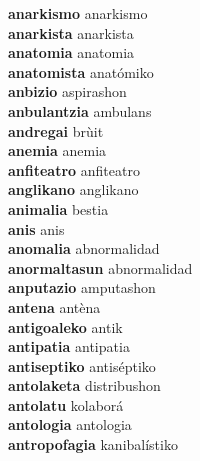 \textbf{anarkismo } anarkismo \\
\textbf{anarkista } anarkista \\
\textbf{anatomia } anatomia \\
\textbf{anatomista } anatómiko \\
\textbf{anbizio } aspirashon \\
\textbf{anbulantzia } ambulans \\
\textbf{andregai } brùit \\
\textbf{anemia } anemia \\
\textbf{anfiteatro } anfiteatro \\
\textbf{anglikano } anglikano \\
\textbf{animalia } bestia \\
\textbf{anis } anis \\
\textbf{anomalia } abnormalidad \\
\textbf{anormaltasun } abnormalidad \\
\textbf{anputazio } amputashon \\
\textbf{antena } antèna \\
\textbf{antigoaleko } antik \\
\textbf{antipatia } antipatia \\
\textbf{antiseptiko } antiséptiko \\
\textbf{antolaketa } distribushon \\
\textbf{antolatu } kolaborá \\
\textbf{antologia } antologia \\
\textbf{antropofagia } kanibalístiko \\
